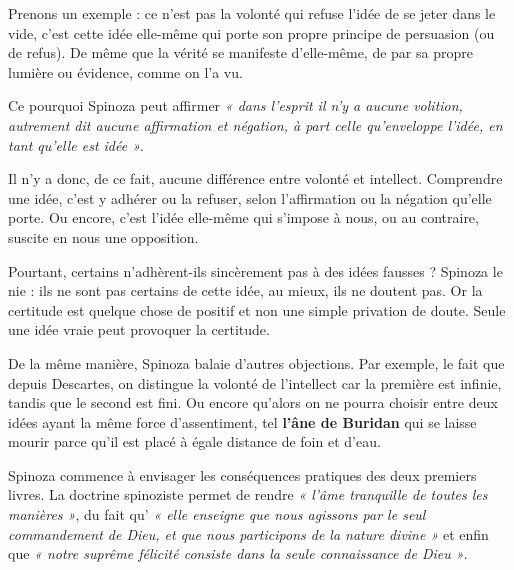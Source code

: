 Prenons un exemple : ce n’est pas la volonté qui refuse l’idée de se jeter dans
le vide, c’est cette idée elle-même qui porte son propre principe de persuasion
(ou de refus). De même que la vérité se manifeste d’elle-même, de par sa propre
lumière ou évidence, comme on l’a vu.

Ce pourquoi Spinoza peut affirmer {\it « dans l’esprit il n’y a aucune volition,
autrement dit aucune affirmation et négation, à part celle qu’enveloppe l’idée,
en tant qu’elle est idée »}.

Il n’y a donc, de ce fait, aucune différence entre volonté et intellect.
Comprendre une idée, c’est y adhérer ou la refuser, selon l’affirmation ou la
négation qu’elle porte. Ou encore, c’est l’idée elle-même qui s’impose à nous,
ou au contraire, suscite en nous une opposition.

\vspace{0.5cm}
Pourtant, certains n’adhèrent-ils sincèrement pas à des idées fausses ? Spinoza
le nie : ils ne sont pas certains de cette idée, au mieux, ils ne doutent pas.
Or la certitude est quelque chose de positif et non une simple privation de
doute. Seule une idée vraie peut provoquer la certitude.

De la même manière, Spinoza balaie d’autres objections. Par exemple, le fait
que depuis Descartes, on distingue la volonté de l’intellect car la première
est infinie, tandis que le second est fini. Ou encore qu’alors on ne pourra
choisir entre deux idées ayant la même force d’assentiment, tel {\bf l’âne de
Buridan} qui se laisse mourir parce qu’il est placé à égale distance de foin
et d’eau.

Spinoza commence à envisager les conséquences pratiques des deux premiers
livres. La doctrine spinoziste permet de rendre {\it « l’âme tranquille de toutes
les manières »}, du fait qu’ {\it « elle enseigne que nous agissons par le seul
commandement de Dieu, et que nous participons de la nature divine »} et enfin
que {\it « notre suprême félicité consiste dans la seule connaissance de Dieu »}.

